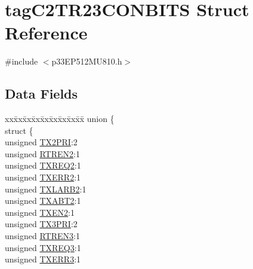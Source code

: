 \hypertarget{structtag_c2_t_r23_c_o_n_b_i_t_s}{}\section{tag\+C2\+T\+R23\+C\+O\+N\+B\+I\+TS Struct Reference}
\label{structtag_c2_t_r23_c_o_n_b_i_t_s}


{\ttfamily \#include $<$p33\+E\+P512\+M\+U810.\+h$>$}

\subsection*{Data Fields}
\begin{DoxyCompactItemize}
\item 
\begin{tabbing}
xx\=xx\=xx\=xx\=xx\=xx\=xx\=xx\=xx\=\kill
union \{\\
\>struct \{\\
\>\>unsigned \hyperlink{structtag_c2_t_r23_c_o_n_b_i_t_s_a3a1399b0b76cd4a585b343e955264ede}{TX2PRI}:2\\
\>\>unsigned \hyperlink{structtag_c2_t_r23_c_o_n_b_i_t_s_ae493e6bcad8d0465a07a529faacd0d85}{RTREN2}:1\\
\>\>unsigned \hyperlink{structtag_c2_t_r23_c_o_n_b_i_t_s_ab6c9ac0d87cabb9c2ec33ae25d6597a7}{TXREQ2}:1\\
\>\>unsigned \hyperlink{structtag_c2_t_r23_c_o_n_b_i_t_s_aebf5b60b8ac70c2b840460fabd90173d}{TXERR2}:1\\
\>\>unsigned \hyperlink{structtag_c2_t_r23_c_o_n_b_i_t_s_a8c1902321c244b57958213e7ff60c1fe}{TXLARB2}:1\\
\>\>unsigned \hyperlink{structtag_c2_t_r23_c_o_n_b_i_t_s_ae72379093b477b247c357f11e819d3e1}{TXABT2}:1\\
\>\>unsigned \hyperlink{structtag_c2_t_r23_c_o_n_b_i_t_s_a1d4eeb7e60c688264b0776a8f70d6d86}{TXEN2}:1\\
\>\>unsigned \hyperlink{structtag_c2_t_r23_c_o_n_b_i_t_s_a4223418ab53b7f23cff26678911b9c43}{TX3PRI}:2\\
\>\>unsigned \hyperlink{structtag_c2_t_r23_c_o_n_b_i_t_s_afcb7c827eacc4aca6fbe5071b256589a}{RTREN3}:1\\
\>\>unsigned \hyperlink{structtag_c2_t_r23_c_o_n_b_i_t_s_a47e1fc4fb58ee84e505cba762a6d1acf}{TXREQ3}:1\\
\>\>unsigned \hyperlink{structtag_c2_t_r23_c_o_n_b_i_t_s_a6e47904e946a63d8075f4210004e297f}{TXERR3}:1\\

\end{tabbing}
\end{DoxyCompactItemize}

